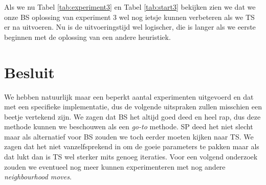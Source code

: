 \documentclass[kulak]{kulakarticle} %
\begin{document}
\noindent Als we nu Tabel \ref{tab:experiment3} en Tabel \ref{tab:start3} bekijken zien we dat we onze BS oplossing van experiment 3 wel nog ietsje kunnen verbeteren als we TS er na uitvoeren. Nu is de uitvoeringstijd wel logischer, die is langer als we eerste beginnen met de oplossing van een andere heuristiek.

\section*{Besluit}

We hebben natuurlijk maar een beperkt aantal experimenten uitgevoerd en dat met een specifieke implementatie, dus de volgende uitspraken zullen misschien een beetje vertekend zijn. We zagen dat BS het altijd goed deed en heel rap, dus deze methode kunnen we beschouwen als een \textit{go-to} methode. SP deed het niet slecht maar als alternatief voor BS zouden we toch eerder moeten kijken naar TS. We zagen dat het niet vanzelfsprekend in om de goeie parameters te pakken maar als dat lukt dan is TS wel sterker mits genoeg iteraties. Voor een volgend onderzoek zouden we eventueel nog meer kunnen experimenteren met nog andere \textit{neighbourhood moves}.



\clearpage
\end{document}
